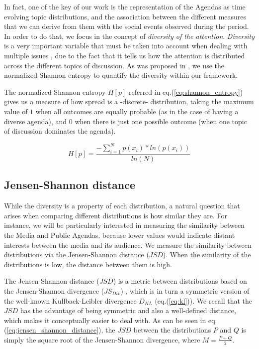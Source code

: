 \documentclass{bmcart}
\begin{document}
\par In fact, one of the key of our work is the representation of the Agendas as time evolving topic distributions, and the association between the different measures that we can derive from them with the social events observed during the period.
In order to do that, we focus in the concept of \emph{diversity of the attention}.
\emph{Diversity} is a very important variable that must be taken into account when dealing with multiple issues \cite{boydstun2014importance}, due to the fact that it tells us how the attention is distributed across the different topics of discussion. 
As was proposed in \cite{boydstun2014importance}, we use the normalized Shannon entropy to quantify the diversity within our framework.
\par The normalized Shannon entropy $H[p]$ referred in eq.(\ref{eq:shannon_entropy}) gives us a measure of how spread is a -discrete- distribution, taking the maximum value of $1$ when all outcomes are equally probable (as in the case of having a diverse agenda), and $0$ when there is just one possible outcome (when one topic of discussion dominates the agenda). 

\begin{equation}
H[p] = \frac{- \sum_{i = 1}^{N} p(x_i) * ln(p(x_i))}{ln(N)}
\label{eq:shannon_entropy}
\end{equation}

\subsection*{Jensen-Shannon distance}

\par While the diversity is a property of each distribution, a natural question that arises when comparing different distributions is how similar they are. For instance, we will be particularly interested in measuring the similarity between the Media and Public Agendas, because lower values would indicate distant interests between the media and its audience.
We measure the similarity between distributions via the Jensen-Shannon distance ($JSD$). 
When the similarity of the distributions is low, the distance between them is high.
\par The Jensen-Shannon distance ($JSD$) is a metric between distributions based on the Jensen-Shannon divergence ($JS_{Div}$) \cite{fuglede2004jensen}, which is in turn a symmetric version of the well-known Kullback-Leibler divergence $D_{KL}$ (eq.(\ref{eq:kl})). 
We recall that the $JSD$ has the advantage of being symmetric and also a well-defined distance, which makes it conceptually easier to deal with.
As can be seen in eq.(\ref{eq:jensen_shannon_distance}), the $JSD$ between the distributions $P$ and $Q$ is simply the square root of the Jensen-Shannon divergence, where $M = \frac{P + Q}{2}$.
\end{document}
